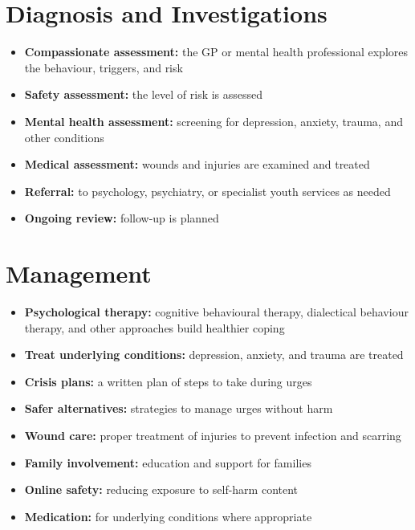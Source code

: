 \section*{Diagnosis and Investigations}
\begin{itemize}
    \item \textbf{Compassionate assessment:} the GP or mental health professional explores the behaviour, triggers, and risk
    \item \textbf{Safety assessment:} the level of risk is assessed
    \item \textbf{Mental health assessment:} screening for depression, anxiety, trauma, and other conditions
    \item \textbf{Medical assessment:} wounds and injuries are examined and treated
    \item \textbf{Referral:} to psychology, psychiatry, or specialist youth services as needed
    \item \textbf{Ongoing review:} follow-up is planned
\end{itemize}

\section*{Management}
\begin{itemize}
    \item \textbf{Psychological therapy:} cognitive behavioural therapy, dialectical behaviour therapy, and other approaches build healthier coping
    \item \textbf{Treat underlying conditions:} depression, anxiety, and trauma are treated
    \item \textbf{Crisis plans:} a written plan of steps to take during urges
    \item \textbf{Safer alternatives:} strategies to manage urges without harm
    \item \textbf{Wound care:} proper treatment of injuries to prevent infection and scarring
    \item \textbf{Family involvement:} education and support for families
    \item \textbf{Online safety:} reducing exposure to self-harm content
    \item \textbf{Medication:} for underlying conditions where appropriate
\end{itemize}


